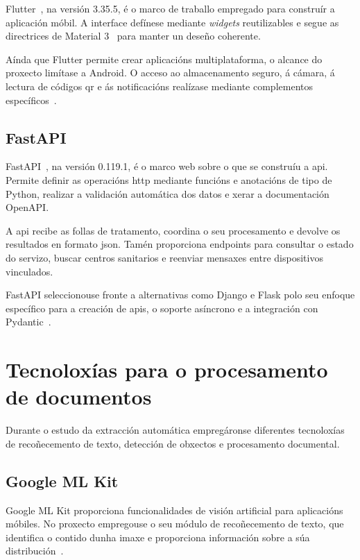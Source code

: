 Flutter~\cite{FlutterArchitecture}, na versión 3.35.5, é o marco de traballo empregado para construír a aplicación móbil. A interface defínese mediante \textit{widgets} reutilizables e segue as directrices de Material 3~\cite{MaterialDesign3} para manter un deseño coherente.

Aínda que Flutter permite crear aplicacións multiplataforma, o alcance do proxecto limítase a Android. O acceso ao almacenamento seguro, á cámara, á lectura de códigos \gls{qr} e ás notificacións realízase mediante complementos específicos~\cite{FlutterPlugins}.

\subsection{FastAPI}

FastAPI~\cite{FastAPIFeatures}, na versión 0.119.1, é o marco web sobre o que se construíu a \gls{api}. Permite definir as operacións \gls{http} mediante funcións e anotacións de tipo de Python, realizar a validación automática dos datos e xerar a documentación OpenAPI.

A \gls{api} recibe as follas de tratamento, coordina o seu procesamento e devolve os resultados en formato \gls{json}. Tamén proporciona endpoints para consultar o estado do servizo, buscar centros sanitarios e reenviar mensaxes entre dispositivos vinculados.

FastAPI seleccionouse fronte a alternativas como Django e Flask polo seu enfoque específico para a creación de \glspl{api}, o soporte asíncrono e a integración con Pydantic~\cite{DjangoOverview,FlaskExtensions,FastAPIFeatures}.

\section{Tecnoloxías para o procesamento de documentos}
\label{sec:tecnoloxias-procesamento}

Durante o estudo da extracción automática empregáronse diferentes tecnoloxías de recoñecemento de texto, detección de obxectos e procesamento documental. 

\subsection{Google ML Kit}
\label{sec:tec-mlkit}

Google ML Kit proporciona funcionalidades de visión artificial para aplicacións móbiles. No proxecto empregouse o seu módulo de recoñecemento de texto, que identifica o contido dunha imaxe e proporciona información sobre a súa distribución~\cite{GoogleMLKitTextRecognition}.

